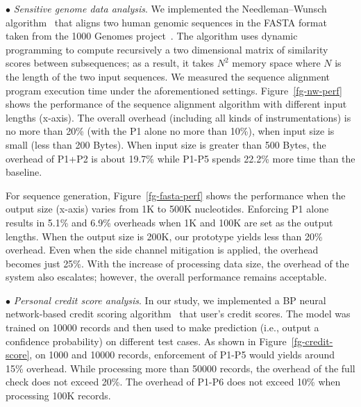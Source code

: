 \vspace{2pt}\noindent$\bullet$\textit{ Sensitive genome data analysis}. We implemented the Needleman–Wunsch algorithm~\cite{needleman1970general} that aligns two human genomic sequences in the FASTA format~\cite{fasta-format} taken from the 1000 Genomes project~\cite{1000genomes}. The algorithm uses dynamic programming to compute recursively a two dimensional matrix of similarity scores between subsequences; as a result, it takes $N^2$ memory space where $N$ is the length of the two input sequences. 
We measured the sequence alignment program execution time under the aforementioned settings. Figure~\ref{fg-nw-perf} shows the performance of the sequence alignment algorithm with different input lengths (x-axis). The overall overhead (including all kinds of instrumentations) is no more than 20\% (with the P1 alone no more than 10\%), when input size is small (less than 200 Bytes). When input size is greater than 500 Bytes, the overhead of P1+P2 is about 19.7\%  while P1-P5 spends 22.2\% more time than the baseline.


%
%
%

For sequence generation, Figure~\ref{fg-fasta-perf} shows the performance when the output size (x-axis) varies from 1K to 500K nucleotides. Enforcing P1 alone results in 5.1\% and 6.9\% overheads when 1K and 100K are set as the output lengths. When the output size is 200K, our prototype yields less than 20\% overhead. Even when the side channel mitigation is applied, the overhead becomes just 25\%. With the increase of processing data size, the overhead of the system also escalates; however, the overall performance remains acceptable.
\DIFaddbegin {}\DIFaddend 

\vspace{2pt}\noindent$\bullet$\textit{ Personal credit score analysis}. In our study, we implemented a BP neural network-based credit scoring algorithm~\cite{jensen1992using} that \DIFdelbegin {}\DIFdelend \DIFaddbegin {}\DIFaddend user's credit scores. The model was trained on 10000 records and then used to make prediction (i.e., output a confidence probability) on different test cases.
As shown in Figure~\ref{fg-credit-score}, on 1000 and 10000 records, enforcement of P1-P5 would yields around 15\% overhead. 
While processing more than 50000 records, the overhead of the full check does not exceed 20\%.  The overhead of P1-P6 does not exceed 10\% when processing 100K records.

